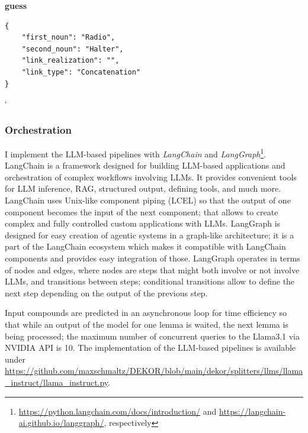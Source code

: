 \documentclass[11pt]{article}
\begin{document}
\begin{center}
\begin{tcolorbox}[colback=gray!10, colframe=black, width=\linewidth, left=1mm, right=1mm, title=Prediction of \texttt{radio\_halter} from \textit{Llama-instruct\textsubscript{+cand+par}}, breakable]
        \begin{aimessage}{\textbf{guess}}
            \begin{verbatim}
{
    "first_noun": "Radio",
    "second_noun": "Halter",
    "link_realization": "",
    "link_type": "Concatenation"
}
            \end{verbatim}`
        \end{aimessage}
        
    \end{tcolorbox}
\end{center}
\label{chat:radiohalter}


\subsubsection{Orchestration}

I implement the LLM-based pipelines with \textit{LangChain} and \textit{LangGraph}\footnote{\url{https://python.langchain.com/docs/introduction/} and \url{https://langchain-ai.github.io/langgraph/}, respectively}. LangChain is a framework designed for building LLM-based applications and orchestration of complex workflows involving LLMs. It provides convenient tools for LLM inference, RAG, structured output, defining tools, and much more. LangChain uses Unix-like component piping (LCEL) so that the output of one component becomes the input of the next component; that allows to create complex and fully controlled custom applications with LLMs. LangGraph is designed for easy creation of agentic systems in a graph-like architecture; it is a part of the LangChain ecosystem which makes it compatible with LangChain components and provides easy integration of those. LangGraph operates in terms of nodes and edges, where nodes are steps that might both involve or not involve LLMs, and transitions between steps; conditional transitions allow to define the next step depending on the output of the previous step.

Input compounds are predicted in an asynchronous loop for time efficiency so that while an output of the model for one lemma is waited, the next lemma is being processed; the maximum number of concurrent queries to the Llama3.1 via NVIDIA API is 10. The implementation of the LLM-based pipelines is available under \url{https://github.com/maxschmaltz/DEKOR/blob/main/dekor/splitters/llms/llama_instruct/llama_instruct.py}.
\end{document}
